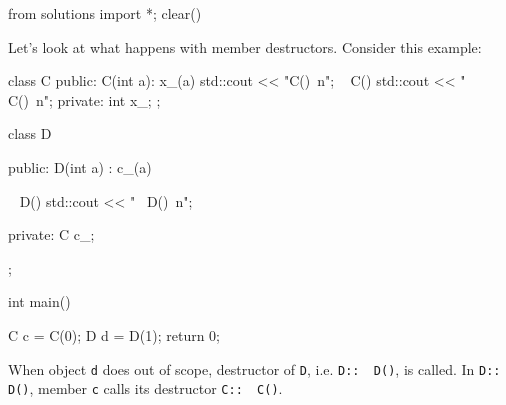 \begin{python0}
from solutions import *; clear()
\end{python0}

Let's look at what happens with member destructors.
Consider this example:

\begin{console}
class C
{
public:
        C(int a): x_(a)
        {
             std::cout << "C()\ n";
        }
        ~ C()
        {
             std::cout << "~ C()\ n";
        }
private:
        int x_;
};

class D
{
public:
        D(int a)
            : c_(a)
        {}
        
        ~ D()
        {
            std::cout << "~ D()\ n";
        }
        
private:
        C c_;
};

int main()
{   
    C c = C(0);
    D d = D(1);
    return 0;

}
\end{console}

When object \texttt{d} does out of scope, destructor of \texttt{D}, i.e.
\texttt{D::~ D()}, is called. In
\texttt{D::~ D()}, member \texttt{c} calls its destructor
\texttt{C::~ C()}.


